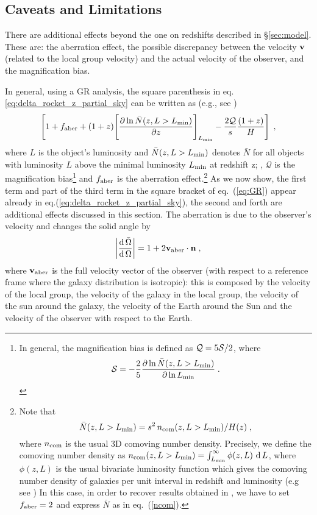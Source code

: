 \documentclass[a4paper,11pt]{article}
\renewcommand{\d}{\operatorname{d}}
\begin{document}
\subsection{Caveats and Limitations}

There are additional effects beyond the one on redshifts described in \S \ref{sec:model}. 
These are: the aberration effect, the possible discrepancy between the velocity ${\bf v}$ (related to  the local group velocity) and the  actual velocity of the observer, and the magnification bias.

In general, using a GR analysis, the square parenthesis in eq. \eqref{eq:delta_rocket_z_partial_sky} can be written as (e.g., see \cite{Maartens:2017qoa, Bertacca:2019wyg, Nadolny:2021hti})
\begin{equation}
\left[1+f_{\rm aber}+ (1+z)\Bigg[\frac{\partial \ln\bar N(z, L>L_{\rm min})}{\partial z}\Bigg]_{L_{\rm min}}-\frac{2\mathcal{Q}}{ {s}}\frac{(1+ {z})}{H}\right]\;,
\label{eq:GR}
\end{equation}
where
$L$ is the object's luminosity  and $\bar{N}(z,L>L_{\rm min})$ denotes $\bar{N}$ for all objects with luminosity $L$ above the minimal luminosity $L_{\rm min}$  at redshift z; , $\mathcal{Q}$ is the magnification bias\footnote{In general, the magnification bias is defined as $\mathcal{Q}=5 {\cal S}/2$, where 
\[{\cal S} =-{2\over 5}{\partial \ln \bar N(z,L>L_{\rm min})\over \partial \ln L_{\rm min}}\;.\]}
 and $f_{\rm aber}$ is the aberration effect.\footnote{Note that 
 \begin{equation}
 \label{ncom}
     \bar N(z, L>L_{\rm min})=s^2\, n_{\rm com}(z, L>L_{\rm min})/H(z)\;, 
 \end{equation}
 where $n_{\rm com}$ is the usual 3D comoving number density. Precisely, we define the comoving number density as $n_{\rm com}(z, L>L_{\rm min})=\int_{L_{\rm min}}^\infty  \phi(z, L)\,\d L$, where $\phi(z, L)$ is the usual bivariate luminosity function  which gives the comoving number density of galaxies per unit interval in redshift and luminosity (e.g see \cite{Broadhurst:1994qu}) In this case, in order to recover  results obtained in  \cite{Maartens:2017qoa, Bertacca:2019wyg, Nadolny:2021hti}, we have to set  $f_{\rm aber}=2$ and express $\bar N$ as in
 eq.~(\ref{ncom}).} As we now show, the first  term and part of the third term in the square bracket of eq.~(\ref{eq:GR}) appear already in eq.(\ref{eq:delta_rocket_z_partial_sky}), the second and forth 
 are additional effects discussed in this section. The aberration is due to the observer's velocity and changes the solid angle by 
\[ \left| \frac{\d \bar\Omega}{ \d \Omega} \right|= 1+2 {\bf v}_{\rm aber} \cdot {\bf n}\;, \]
where 
${\bf v}_{\rm aber}$ is the full velocity vector of the observer (with respect to a reference frame where the galaxy distribution is isotropic): this is composed by the velocity of the local group, the velocity of the galaxy in the local group, the velocity of the sun around the galaxy, the velocity of the Earth around the Sun and the velocity of the observer with respect to the Earth.
\end{document}
